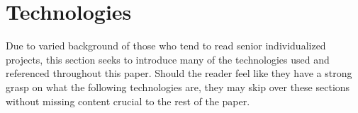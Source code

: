 \section{Technologies}
Due to varied background of those who tend to read senior individualized projects, this section seeks to introduce many of the technologies used and referenced throughout this paper.  Should the reader feel like they have a strong grasp on what the following technologies are, they may skip over these sections without missing content crucial to the rest of the paper.



